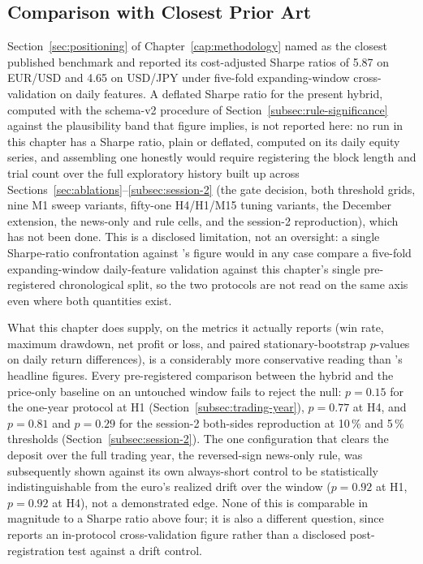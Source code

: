 \subsection{Comparison with Closest Prior Art} \label{sec:zhang-comparison}

Section~\ref{sec:positioning} of Chapter~\ref{cap:methodology} named  as the closest published benchmark and reported its cost-adjusted Sharpe ratios of 5.87 on EUR/USD and 4.65 on USD/JPY under five-fold expanding-window cross-validation on daily features. A deflated Sharpe ratio for the present hybrid, computed with the schema-v2 procedure of Section~\ref{subsec:rule-significance} against the plausibility band that figure implies, is not reported here: no run in this chapter has a Sharpe ratio, plain or deflated, computed on its daily equity series, and assembling one honestly would require registering the block length and trial count over the full exploratory history built up across Sections~\ref{sec:ablations}--\ref{subsec:session-2} (the gate decision, both threshold grids, nine M1 sweep variants, fifty-one H4/H1/M15 tuning variants, the December extension, the news-only and rule cells, and the session-2 reproduction), which has not been done. This is a disclosed limitation, not an oversight: a single Sharpe-ratio confrontation against 's figure would in any case compare a five-fold expanding-window daily-feature validation against this chapter's single pre-registered chronological split, so the two protocols are not read on the same axis even where both quantities exist.

What this chapter does supply, on the metrics it actually reports (win rate, maximum drawdown, net profit or loss, and paired stationary-bootstrap $p$-values on daily return differences), is a considerably more conservative reading than 's headline figures. Every pre-registered comparison between the hybrid and the price-only baseline on an untouched window fails to reject the null: $p=0.15$ for the one-year protocol at H1 (Section~\ref{subsec:trading-year}), $p=0.77$ at H4, and $p=0.81$ and $p=0.29$ for the session-2 both-sides reproduction at 10\,\% and 5\,\% thresholds (Section~\ref{subsec:session-2}). The one configuration that clears the deposit over the full trading year, the reversed-sign news-only rule, was subsequently shown against its own always-short control to be statistically indistinguishable from the euro's realized drift over the window ($p=0.92$ at H1, $p=0.92$ at H4), not a demonstrated edge. None of this is comparable in magnitude to a Sharpe ratio above four; it is also a different question, since  reports an in-protocol cross-validation figure rather than a disclosed post-registration test against a drift control.

